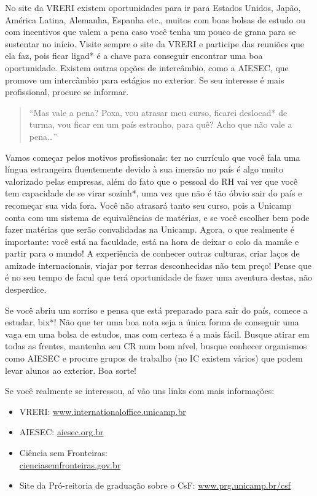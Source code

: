 No site da VRERI existem oportunidades para ir para Estados Unidos, Japão,
América Latina, Alemanha, Espanha etc., muitos com boas bolsas de estudo ou com
incentivos que valem a pena caso você tenha um pouco de grana para se sustentar
no início. Visite sempre o site da VRERI e participe das reuniões que ela faz,
pois ficar ligad* é a chave para conseguir encontrar uma boa
oportunidade. Existem outras opções de intercâmbio, como a AIESEC, que promove
um intercâmbio para estágios no exterior. Se seu interesse é mais profissional,
procure se informar.

\begin{quote}
``Mas vale a pena? Poxa, vou atrasar meu curso, ficarei deslocad* de turma, vou
ficar em um país estranho, para quê? Acho que não vale a pena{\dots}''
\end{quote}
Vamos começar pelos motivos profissionais: ter no currículo que você fala uma
língua estrangeira fluentemente devido à sua imersão no país é algo muito
valorizado pelas empresas, além do fato que o pessoal do RH vai ver que você tem
capacidade de se virar sozinh*, uma vez que não é tão óbvio sair do país e
recomeçar sua vida fora. Você não atrasará tanto seu curso, pois a Unicamp conta
com um sistema de equivalências de matérias, e se você escolher bem pode fazer
matérias que serão convalidadas na Unicamp. Agora, o que realmente é importante:
você está na faculdade, está na hora de deixar o colo da mamãe e partir para o
mundo! A experiência de conhecer outras culturas, criar laços de amizade
internacionais, viajar por terras desconhecidas não tem preço! Pense que é no
seu tempo de facul que terá oportunidade de fazer uma aventura destas, não
desperdice.

Se você abriu um sorriso e pensa que está preparado para sair do país, comece a
estudar, bix*! Não que ter uma boa nota seja a única forma de conseguir uma vaga
em uma bolsa de estudos, mas com certeza é a mais fácil.  Busque atirar em todas
as frentes, mantenha seu CR num bom nível, busque conhecer organismos como
AIESEC e procure grupos de trabalho (no IC existem vários) que podem levar
alunos ao exterior. Boa sorte!

Se você realmente se interessou, aí vão uns links com mais informações:

\begin{itemize}
    \item  VRERI: \url{www.internationaloffice.unicamp.br}
    \item  AIESEC: \url{aiesec.org.br}
    \item  Ciência sem Fronteiras: \\\url{cienciasemfronteiras.gov.br}
    \item  Site da Pró-reitoria de graduação sobre o CsF: \url{www.prg.unicamp.br/csf}
\end{itemize}

